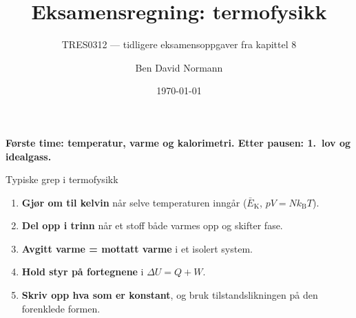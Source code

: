 \documentclass[aspectratio=169, 12pt]{beamer}
\title{Eksamensregning: termofysikk}
\subtitle{TRES0312 --- tidligere eksamensoppgaver fra kapittel 8}
\author{Ben David Normann}
\date{\today}
\begin{document}
\begin{frame}[plain]
  \titlepage
  \vspace{0.3cm}
  \begin{center}
  {\bfseries\color{repcol} Første time: temperatur, varme og kalorimetri. Etter pausen: 1.\ lov og idealgass.}
  \end{center}
\end{frame}

\begin{frame}{}


\end{frame}

\begin{frame}{Typiske grep i termofysikk}

  \begin{enumerate}[1.]
    \item<1-> \textbf{Gjør om til kelvin} når selve temperaturen inngår ($\bar{E}_\text{K}$, $pV = Nk_\text{B}T$).
    \item<2-> \textbf{Del opp i trinn} når et stoff både varmes opp og skifter fase.
    \item<3-> \textbf{Avgitt varme = mottatt varme} i et isolert system.
    \item<4-> \textbf{Hold styr på fortegnene} i $\Delta U = Q + W$.
    \item<5-> \textbf{Skriv opp hva som er konstant}, og bruk tilstandslikningen på den forenklede formen.
  \end{enumerate}

\end{frame}
\end{document}
